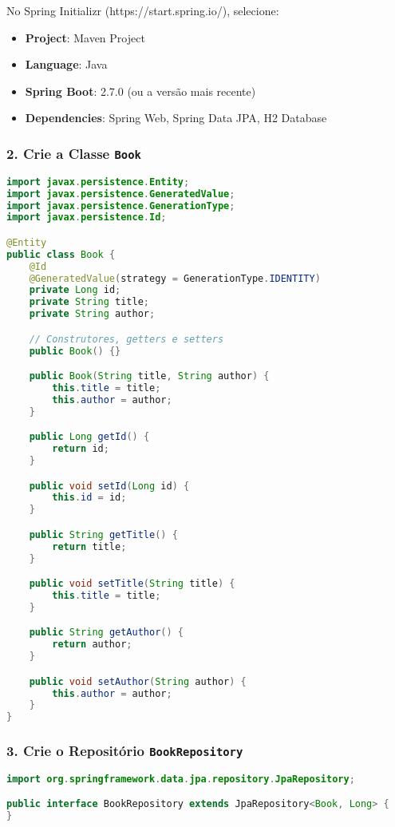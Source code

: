\documentclass[a4paper,12pt]{book}
\begin{document}
No Spring Initializr (https://start.spring.io/), selecione:
\begin{itemize}
    \item \textbf{Project}: Maven Project
    \item \textbf{Language}: Java
    \item \textbf{Spring Boot}: 2.7.0 (ou a versão mais recente)
    \item \textbf{Dependencies}: Spring Web, Spring Data JPA, H2 Database
\end{itemize}

\subsubsection{2. Crie a Classe \texttt{Book}}

\begin{lstlisting}[language=Java, caption={Classe Book}]
import javax.persistence.Entity;
import javax.persistence.GeneratedValue;
import javax.persistence.GenerationType;
import javax.persistence.Id;

@Entity
public class Book {
    @Id
    @GeneratedValue(strategy = GenerationType.IDENTITY)
    private Long id;
    private String title;
    private String author;

    // Construtores, getters e setters
    public Book() {}

    public Book(String title, String author) {
        this.title = title;
        this.author = author;
    }

    public Long getId() {
        return id;
    }

    public void setId(Long id) {
        this.id = id;
    }

    public String getTitle() {
        return title;
    }

    public void setTitle(String title) {
        this.title = title;
    }

    public String getAuthor() {
        return author;
    }

    public void setAuthor(String author) {
        this.author = author;
    }
}
\end{lstlisting}

\subsubsection{3. Crie o Repositório \texttt{BookRepository}}

\begin{lstlisting}[language=Java, caption={Repositório Book}]
import org.springframework.data.jpa.repository.JpaRepository;

public interface BookRepository extends JpaRepository<Book, Long> {
}
\end{lstlisting}
\end{document}
